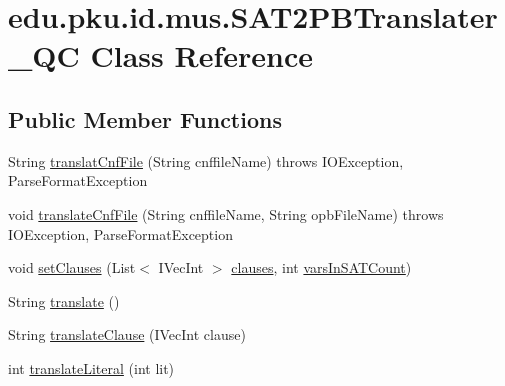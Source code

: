 \hypertarget{classedu_1_1pku_1_1id_1_1mus_1_1_s_a_t2_p_b_translater___q_c}{
\section{edu.pku.id.mus.SAT2PBTranslater\_\-QC Class Reference}
\label{classedu_1_1pku_1_1id_1_1mus_1_1_s_a_t2_p_b_translater___q_c}
}
\subsection*{Public Member Functions}
\begin{DoxyCompactItemize}
\item 
String \hyperlink{classedu_1_1pku_1_1id_1_1mus_1_1_s_a_t2_p_b_translater___q_c_aac2f5db0396034961733e2d6868d0cdc}{translatCnfFile} (String cnffileName)  throws IOException,             ParseFormatException 
\item 
void \hyperlink{classedu_1_1pku_1_1id_1_1mus_1_1_s_a_t2_p_b_translater___q_c_aa86f6753e627457a86e523c68276eb4a}{translateCnfFile} (String cnffileName, String opbFileName)  throws IOException, ParseFormatException 
\item 
void \hyperlink{classedu_1_1pku_1_1id_1_1mus_1_1_s_a_t2_p_b_translater___q_c_af8b5565d9b8ae23a02159c5e50691c62}{setClauses} (List$<$ IVecInt $>$ \hyperlink{classedu_1_1pku_1_1id_1_1mus_1_1_s_a_t2_p_b_translater___q_c_a3b2a0756c6d32ae774de4199a892e219}{clauses}, int \hyperlink{classedu_1_1pku_1_1id_1_1mus_1_1_s_a_t2_p_b_translater___q_c_a7fe2d4c8a7d85ea657476012e0d321e4}{varsInSATCount})
\item 
String \hyperlink{classedu_1_1pku_1_1id_1_1mus_1_1_s_a_t2_p_b_translater___q_c_a34166fe678934d5f8a44f7eeb1616cf1}{translate} ()
\item 
String \hyperlink{classedu_1_1pku_1_1id_1_1mus_1_1_s_a_t2_p_b_translater___q_c_a5bbe9134de541d902d4b6c655e3c8000}{translateClause} (IVecInt clause)
\item 
int \hyperlink{classedu_1_1pku_1_1id_1_1mus_1_1_s_a_t2_p_b_translater___q_c_a6e147c6bfbc29cf0ad171f9956f8c80c}{translateLiteral} (int lit)
\end{DoxyCompactItemize}
